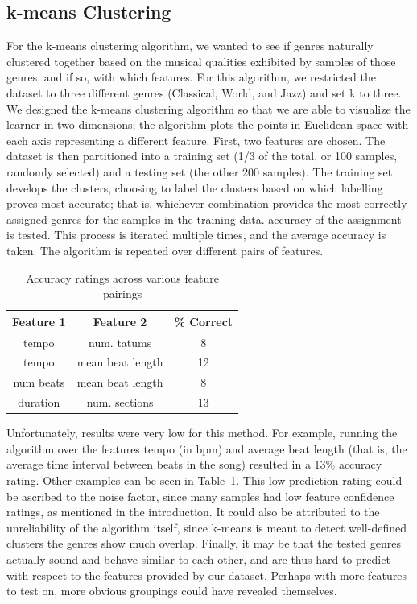 \documentclass[11pt, twocolumn]{article}
\begin{document}
\subsection{k-means Clustering}
    For the k-means clustering algorithm, we wanted to see if genres naturally
clustered together based on the musical qualities exhibited by samples of those
genres, and if so, with which features. For this algorithm, we restricted the
dataset to three different genres (Classical, World, and Jazz) and set k to
three. We designed the k-means clustering algorithm so that we are able to
visualize the learner in two dimensions; the algorithm plots the points in
Euclidean space with each axis representing a different feature.
    First, two features are chosen. The dataset is then partitioned into a
training set (1/3 of the total, or 100 samples, randomly selected) and a
testing set (the other 200 samples). The training set develops the clusters,
choosing to label the clusters based on which labelling proves most accurate;
that is, whichever combination provides the most correctly assigned genres for
the samples in the training data.
accuracy of the assignment is tested. This process is iterated multiple times,
and the average accuracy is taken. The algorithm is repeated over different
pairs of features.

\begin{table}
  \begin{center}
    \begin{tabular}{ |c|c|c| }
      \hline
      Feature 1 & Feature 2 & \% Correct \\
      \hline
      tempo & num. tatums & 8 \\
      tempo & mean beat length & 12 \\
      num beats & mean beat length & 8 \\
      duration & num. sections & 13 \\
      \hline
    \end{tabular}
  \end{center}
  \caption{Accuracy ratings across various feature pairings}
  \label{tab:accuracy}
\end{table}

    Unfortunately, results were very low for this method. For example, running
the algorithm over the features tempo (in bpm) and average beat length (that
is, the average time interval between beats in the song) resulted in a 13\%
accuracy rating. Other examples can be seen in Table~\ref{tab:accuracy}. This
low prediction rating could be ascribed to the noise factor, since many samples
had low feature confidence ratings, as mentioned in the introduction. It could
also be attributed to the unreliability of the algorithm itself, since k-means
is meant to detect well-defined clusters
the genres show much overlap. Finally, it may be that the tested genres actually
sound and behave similar to each other, and are thus hard to predict with
respect to the features provided by our dataset. Perhaps with more features to
test on, more obvious groupings could have revealed themselves.
\vfill
\eject
\end{document}
